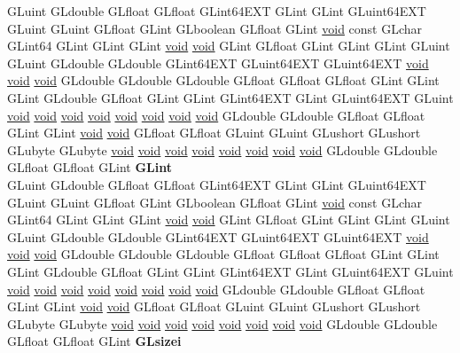 \begin{DoxyCompactItemize}
\begin{tabbing}
\>GLuint GLdouble GLfloat GLfloat GLint64EXT GLint GLint GLuint64EXT GLuint GLuint GLfloat GLint GLboolean GLfloat GLint \hyperlink{interfacevoid}{void} const GLchar GLint64 GLint GLint GLint \hyperlink{interfacevoid}{void} \hyperlink{interfacevoid}{void} GLint GLfloat GLint GLint GLint GLuint GLuint GLdouble GLdouble GLint64EXT GLuint64EXT GLuint64EXT \hyperlink{interfacevoid}{void} \hyperlink{interfacevoid}{void} \hyperlink{interfacevoid}{void} GLdouble GLdouble GLdouble GLfloat GLfloat GLfloat GLint GLint GLint GLdouble GLfloat GLint GLint GLint64EXT GLint GLuint64EXT GLuint \hyperlink{interfacevoid}{void} \hyperlink{interfacevoid}{void} \hyperlink{interfacevoid}{void} \hyperlink{interfacevoid}{void} \hyperlink{interfacevoid}{void} \hyperlink{interfacevoid}{void} \hyperlink{interfacevoid}{void} \hyperlink{interfacevoid}{void} GLdouble GLdouble GLfloat GLfloat GLint GLint \hyperlink{interfacevoid}{void} \hyperlink{interfacevoid}{void} GLfloat GLfloat GLuint GLuint GLushort GLushort GLubyte GLubyte \hyperlink{interfacevoid}{void} \hyperlink{interfacevoid}{void} \hyperlink{interfacevoid}{void} \hyperlink{interfacevoid}{void} \hyperlink{interfacevoid}{void} \hyperlink{interfacevoid}{void} \hyperlink{interfacevoid}{void} \hyperlink{interfacevoid}{void} GLdouble GLdouble GLfloat GLfloat GLint {\bfseries GLint}\\
\>GLuint GLdouble GLfloat GLfloat GLint64EXT GLint GLint GLuint64EXT GLuint GLuint GLfloat GLint GLboolean GLfloat GLint \hyperlink{interfacevoid}{void} const GLchar GLint64 GLint GLint GLint \hyperlink{interfacevoid}{void} \hyperlink{interfacevoid}{void} GLint GLfloat GLint GLint GLint GLuint GLuint GLdouble GLdouble GLint64EXT GLuint64EXT GLuint64EXT \hyperlink{interfacevoid}{void} \hyperlink{interfacevoid}{void} \hyperlink{interfacevoid}{void} GLdouble GLdouble GLdouble GLfloat GLfloat GLfloat GLint GLint GLint GLdouble GLfloat GLint GLint GLint64EXT GLint GLuint64EXT GLuint \hyperlink{interfacevoid}{void} \hyperlink{interfacevoid}{void} \hyperlink{interfacevoid}{void} \hyperlink{interfacevoid}{void} \hyperlink{interfacevoid}{void} \hyperlink{interfacevoid}{void} \hyperlink{interfacevoid}{void} \hyperlink{interfacevoid}{void} GLdouble GLdouble GLfloat GLfloat GLint GLint \hyperlink{interfacevoid}{void} \hyperlink{interfacevoid}{void} GLfloat GLfloat GLuint GLuint GLushort GLushort GLubyte GLubyte \hyperlink{interfacevoid}{void} \hyperlink{interfacevoid}{void} \hyperlink{interfacevoid}{void} \hyperlink{interfacevoid}{void} \hyperlink{interfacevoid}{void} \hyperlink{interfacevoid}{void} \hyperlink{interfacevoid}{void} \hyperlink{interfacevoid}{void} GLdouble GLdouble GLfloat GLfloat GLint {\bfseries GLsizei}\\

\end{tabbing}
\end{DoxyCompactItemize}
